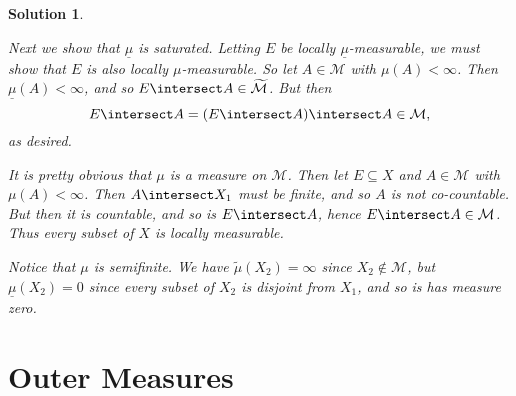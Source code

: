 \documentclass[article, a4paper, 11pt, oneside]{memoir}
\numberwithin{equation}{chapter}
\newcommand{\calM}{\mathcal{M}}
\theoremstyle{nonumberplain}
\newtheorem{solution}{Solution}
\begin{document}
\begin{solution}
\begin{solutionsec}
	Next we show that $\underline\mu$ is saturated. Letting $E$ be locally $\underline\mu$-measurable, we must show that $E$ is also locally $\mu$-measurable. So let $A \in \calM$ with $\mu(A) < \infty$. Then $\underline\mu(A) < \infty$, and so $E \intersect A \in \widetilde{\calM}$. But then
	\begin{equation*}
		E \intersect A
			= (E \intersect A) \intersect A
			\in \calM,
	\end{equation*}
	as desired.

	\item It is pretty obvious that $\mu$ is a measure on $\calM$. Then let $E \subseteq X$ and $A \in \calM$ with $\mu(A) < \infty$. Then $A \intersect X_1$ must be finite, and so $A$ is not co-countable. But then it is countable, and so is $E \intersect A$, hence $E \intersect A \in \calM$. Thus every subset of $X$ is locally measurable.
	
	Notice that $\mu$ is semifinite. We have $\tilde\mu(X_2) = \infty$ since $X_2 \not\in \calM$, but $\underline\mu(X_2) = 0$ since every subset of $X_2$ is disjoint from $X_1$, and so is has measure zero.
\end{solutionsec}
\end{solution}


\section{Outer Measures}


\end{document}
